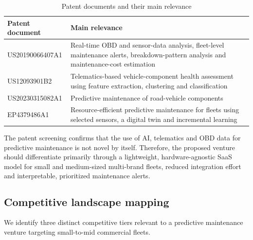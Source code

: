 \documentclass[11pt,a4paper]{article}
\begin{document}
\renewcommand{\arraystretch}{1.5}
\begin{table}[ht]
\centering
\caption{Patent documents and their main relevance}
\label{tab:patents}
\small
\begin{tabularx}{\linewidth}{p{4cm} X}
\toprule
\textbf{Patent document} &
\textbf{Main relevance} \\
\midrule

US20190066407A1 &
Real-time OBD and sensor-data analysis, fleet-level maintenance alerts, breakdown-pattern analysis and maintenance-cost estimation \\

US12093901B2 &
Telematics-based vehicle-component health assessment using feature extraction, clustering and classification \\

US20230315082A1 &
Predictive maintenance of road-vehicle components \\

EP4379486A1 &
Resource-efficient predictive maintenance for fleets using selected sensors, a digital twin and incremental learning \\

\bottomrule
\end{tabularx}
\end{table}

\noindent The patent screening confirms that the use of AI, telematics and OBD data for predictive maintenance is not novel by itself. Therefore, the proposed venture should differentiate primarily through a lightweight, hardware-agnostic SaaS model for small and medium-sized multi-brand fleets, reduced integration effort and interpretable, prioritized maintenance alerts.

\subsection{Competitive landscape mapping}
\noindent We identify three distinct competitive tiers relevant to a predictive maintenance venture targeting small-to-mid commercial fleets.
\end{document}
